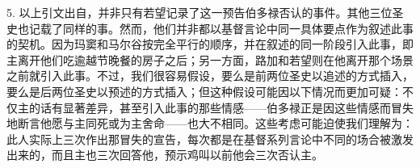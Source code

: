 5.  以上引文出自，并非只有若望记录了这一预告伯多禄否认的事件。其他三位圣史也记载了同样的事。然而，他们并非都以基督言论中同一具体要点作为叙述此事的契机。因为玛窦和马尔谷按完全平行的顺序，并在叙述的同一阶段引入此事，即主离开他们吃逾越节晚餐的房子之后；另一方面，路加和若望则在他离开那个场景之前就引入此事。不过，我们很容易假设，要么是前两位圣史以追述的方式插入，要么是后两位圣史以预述的方式插入；但这种假设可能因以下情况而更加可疑：不仅主的话有显著差异，甚至引入此事的那些情感——伯多禄正是因这些情感而冒失地断言他愿与主同死或为主舍命——也大不相同。这些考虑可能迫使我们理解为：此人实际上三次作出那冒失的宣告，每次都是在基督系列言论中不同的场合被激发出来的，而且主也三次回答他，预示鸡叫以前他会三次否认主。\par

